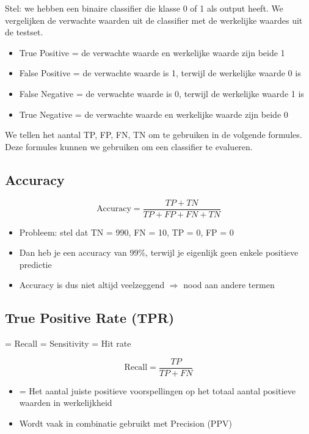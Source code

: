 \documentclass{article}
\begin{document}
Stel: we hebben een binaire classifier die klasse 0 of 1 als output heeft.
We vergelijken de verwachte waarden uit de classifier met de werkelijke waardes uit de testset.

\begin{itemize}
    \item True Positive = de verwachte waarde en werkelijke waarde zijn beide 1
    \item False Positive = de verwachte waarde is 1, terwijl de werkelijke waarde 0 is
    \item False Negative = de verwachte waarde is 0, terwijl de werkelijke waarde 1 is
    \item True Negative = de verwachte waarde en werkelijke waarde zijn beide 0
\end{itemize}

We tellen het aantal TP, FP, FN, TN om te gebruiken in de volgende formules. 
Deze formules kunnen we gebruiken om een classifier te evalueren.

\subsection{Accuracy}

\begin{equation}
    \text{Accuracy} = \frac{TP + TN}{TP + FP + FN + TN}
\end{equation}

\begin{itemize}
    \item Probleem: stel dat TN = 990, FN = 10, TP = 0, FP = 0
    \item Dan heb je een accuracy van 99\%, terwijl je eigenlijk geen enkele positieve predictie
    \item Accuracy is dus niet altijd veelzeggend $\Rightarrow$ nood aan andere termen
\end{itemize}

\subsection{True Positive Rate (TPR)}

= Recall = Sensitivity = Hit rate

\begin{equation}
    \text{Recall} = \frac{TP}{TP + FN}
\end{equation}

\begin{itemize}
    \item = Het aantal juiste positieve voorspellingen op het totaal aantal positieve waarden in werkelijkheid
    \item Wordt vaak in combinatie gebruikt met Precision (PPV)
\end{itemize}
\end{document}
